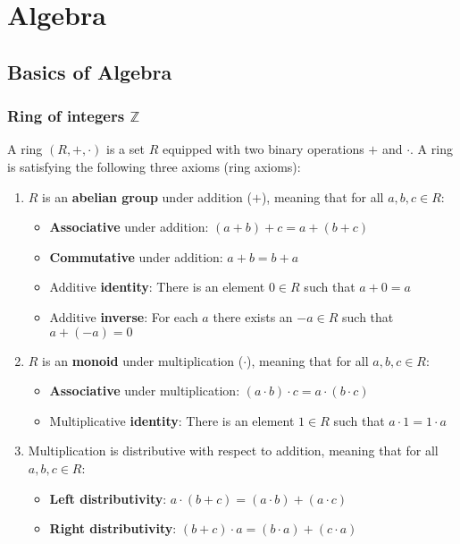 

\chapter{Algebra}
	
\section{Basics of Algebra}
	\subsection{Ring of integers $\mathbb{Z}$}
		A ring $(R,+,\cdot)$ is a set $R$ equipped with two binary operations $+$ and $\cdot$.
		A ring is satisfying the following three axioms (ring axioms):
		\begin{enumerate}
			\item $R$ is an \textbf{abelian group} under addition ($+$), meaning that for all $a,b,c \in R$:
			\begin{itemize}
				\item \textbf{Associative} under addition: $(a+b)+c = a+(b+c)$
				\item \textbf{Commutative} under addition: $a+b = b+a$
				\item Additive \textbf{identity}: There is an element $0 \in R$ such that $a+0 = a$
				\item Additive \textbf{inverse}: For each $a$ there exists an $-a \in R$ such that $a+(-a) = 0$
			\end{itemize}
			\item $R$ is an \textbf{monoid} under multiplication ($\cdot$), meaning that for all $a,b,c \in R$:
			\begin{itemize}
				\item \textbf{Associative} under multiplication: $(a \cdot b) \cdot c = a \cdot (b \cdot c)$
				\item Multiplicative \textbf{identity}: There is an element $1 \in R$ such that $a \cdot 1 = 1 \cdot a$
			\end{itemize}
			\item Multiplication is distributive with respect to addition, meaning that for all $a,b,c \in R$:
			\begin{itemize}
				\item \textbf{Left distributivity}: $a \cdot (b+c) = (a \cdot b) + (a \cdot c)$
				\item \textbf{Right distributivity}: $(b+c) \cdot a = (b \cdot a) + (c \cdot a)$
			\end{itemize}
		\end{enumerate}
		
